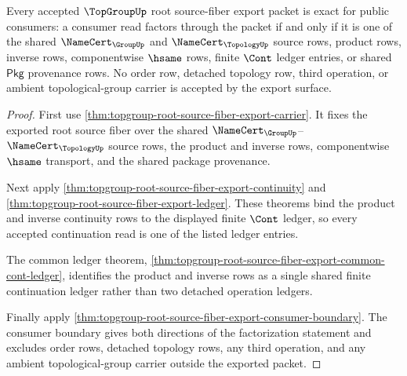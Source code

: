 \begin{theorem}
\label{thm:topgroup-root-source-fiber-export-exactness}
Every accepted $\TopGroupUp$ root source-fiber export packet is exact for
public consumers: a consumer read factors through the packet if and only if it
is one of the shared $\NameCert_{\GroupUp}$ and
$\NameCert_{\TopologyUp}$ source rows, product rows, inverse rows,
componentwise $\hsame$ rows, finite $\Cont$ ledger entries, or shared
$\mathsf{Pkg}$ provenance rows. No order row, detached topology row, third
operation, or ambient topological-group carrier is accepted by the export
surface.
\end{theorem}
\begin{proof}
First use \autoref{thm:topgroup-root-source-fiber-export-carrier}. It fixes
the exported root source fiber over the shared
$\NameCert_{\GroupUp}$--$\NameCert_{\TopologyUp}$ source rows, the product
and inverse rows, componentwise $\hsame$ transport, and the shared package
provenance.

Next apply \autoref{thm:topgroup-root-source-fiber-export-continuity} and
\autoref{thm:topgroup-root-source-fiber-export-ledger}. These theorems bind
the product and inverse continuity rows to the displayed finite $\Cont$
ledger, so every accepted continuation read is one of the listed ledger
entries.

The common ledger theorem,
\autoref{thm:topgroup-root-source-fiber-export-common-cont-ledger}, identifies
the product and inverse rows as a single shared finite continuation ledger
rather than two detached operation ledgers.

Finally apply
\autoref{thm:topgroup-root-source-fiber-export-consumer-boundary}. The
consumer boundary gives both directions of the factorization statement and
excludes order rows, detached topology rows, any third operation, and any
ambient topological-group carrier outside the exported packet.
\end{proof}
